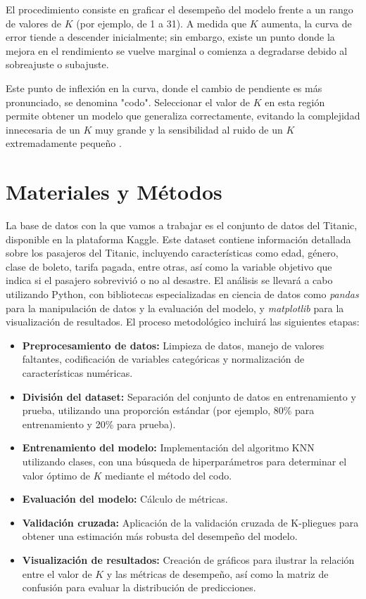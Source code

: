 \documentclass[12pt]{article}
\begin{document}
El procedimiento consiste en graficar el desempeño del modelo frente a un rango de valores de $K$ (por ejemplo, de 1 a 31). A medida que $K$ aumenta, la curva de error tiende a descender inicialmente; sin embargo, existe un punto donde la mejora en el rendimiento se vuelve marginal o comienza a degradarse debido al sobreajuste o subajuste.

Este punto de inflexión en la curva, donde el cambio de pendiente es más pronunciado, se denomina "codo". Seleccionar el valor de $K$ en esta región permite obtener un modelo que generaliza correctamente, evitando la complejidad innecesaria de un $K$ muy grande y la sensibilidad al ruido de un $K$ extremadamente pequeño \cite{shalev2014understanding}.

\section{Materiales y Métodos}

La base de datos con la que vamos a trabajar es el conjunto de datos del Titanic, disponible en la plataforma Kaggle. Este dataset contiene información detallada sobre los pasajeros del Titanic, incluyendo características como edad, género, clase de boleto, tarifa pagada, entre otras, así como la variable objetivo que indica si el pasajero sobrevivió o no al desastre.
El análisis se llevará a cabo utilizando Python, con bibliotecas especializadas en ciencia de datos como \textit{pandas} para la manipulación de datos y la evaluación del modelo, y \textit{matplotlib} para la visualización de resultados. El proceso metodológico incluirá las siguientes etapas:
\begin{itemize}
    \item \textbf{Preprocesamiento de datos:} Limpieza de datos, manejo de valores faltantes, codificación de variables categóricas y normalización de características numéricas.
    \item \textbf{División del dataset:} Separación del conjunto de datos en entrenamiento y prueba, utilizando una proporción estándar (por ejemplo, 80\% para entrenamiento y 20\% para prueba).
    \item \textbf{Entrenamiento del modelo:} Implementación del algoritmo KNN utilizando clases, con una búsqueda de hiperparámetros para determinar el valor óptimo de $K$ mediante el método del codo.
    \item \textbf{Evaluación del modelo:} Cálculo de métricas.
    \item \textbf{Validación cruzada:} Aplicación de la validación cruzada de K-pliegues para obtener una estimación más robusta del desempeño del modelo.
    \item \textbf{Visualización de resultados:} Creación de gráficos para ilustrar la relación entre el valor de $K$ y las métricas de desempeño, así como la matriz de confusión para evaluar la distribución de predicciones.
\end{itemize}
\end{document}

